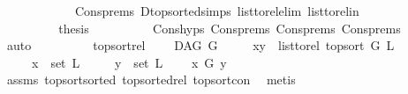 \begin{isabellebody}
\ \ \ \ \ \ \ \ \ \ \ \ Cons{\isachardot}{\kern0pt}prems{\isacharparenleft}{\kern0pt}{}{\isacharparenright}{\kern0pt}\ D{\isachardot}{\kern0pt}top{\isacharunderscore}{\kern0pt}sorted{\isachardot}{\kern0pt}simps{\isacharparenleft}{\kern0pt}{}{\isacharparenright}{\kern0pt}\ list{\isacharunderscore}{\kern0pt}to{\isacharunderscore}{\kern0pt}rel{\isacharunderscore}{\kern0pt}elim\ list{\isacharunderscore}{\kern0pt}to{\isacharunderscore}{\kern0pt}rel{\isacharunderscore}{\kern0pt}in{\isacharparenright}{\kern0pt}\ \isanewline
\ \ \ \ \isamarkupfalse%
\isanewline
\ \ \ \ \ \ \isamarkupfalse%
\ {}\isanewline
\ \ \ \ \ \ \isamarkupfalse%
\ \isamarkupfalse%
\ {\isacharquery}{\kern0pt}thesis\isanewline
\ \ \ \ \ \ \ \ \isamarkupfalse%
\ Cons{\isachardot}{\kern0pt}hyps\ Cons{\isachardot}{\kern0pt}prems{\isacharparenleft}{\kern0pt}{}{\isacharparenright}{\kern0pt}\ Cons{\isachardot}{\kern0pt}prems{\isacharparenleft}{\kern0pt}{}{\isacharparenright}{\kern0pt}\ Cons{\isachardot}{\kern0pt}prems{\isacharparenleft}{\kern0pt}{}{\isacharparenright}{\kern0pt}\ \isamarkupfalse%
\ auto\ \isanewline
\ \ \ \ \isamarkupfalse%
\isanewline
\ \ \isamarkupfalse%
\isanewline
{}\isamarkupfalse%
%
\endisatagproof
{\isafoldproof}%
%
\isadelimproof
\isanewline
%
\endisadelimproof
\isanewline
\isanewline
{}\isamarkupfalse%
\ top{\isacharunderscore}{\kern0pt}sort{\isacharunderscore}{\kern0pt}rel{}{\isacharcolon}{\kern0pt}\ \isanewline
\ \ \ {\isachardoublequoteopen}DAG\ G{\isachardoublequoteclose}\isanewline
\ \ \ \ \ {\isachardoublequoteopen}{\isacharparenleft}{\kern0pt}x{\isacharcomma}{\kern0pt}y{\isacharparenright}{\kern0pt}\ {\isasymin}\ list{\isacharunderscore}{\kern0pt}to{\isacharunderscore}{\kern0pt}rel\ {\isacharparenleft}{\kern0pt}top{\isacharunderscore}{\kern0pt}sort\ G\ L{\isacharparenright}{\kern0pt}{\isachardoublequoteclose}\isanewline
\ \ \ \ \ {\isachardoublequoteopen}x\ {\isasymin}\ set\ L{\isachardoublequoteclose}\isanewline
\ \ \ \ \ {\isachardoublequoteopen}y\ {\isasymin}\ set\ L{\isachardoublequoteclose}\isanewline
\ \ \ {\isachardoublequoteopen}{\isasymnot}\ x\ {\isasymrightarrow}\isactrlsup {\isacharplus}{\kern0pt}\isactrlbsub G\isactrlesub \ y{\isachardoublequoteclose}\isanewline
%
\isadelimproof
\ \ %
\endisadelimproof
%
\isatagproof
{}\isamarkupfalse%
\ assms\ top{\isacharunderscore}{\kern0pt}sort{\isacharunderscore}{\kern0pt}sorted\ top{\isacharunderscore}{\kern0pt}sorted{\isacharunderscore}{\kern0pt}rel{}\ top{\isacharunderscore}{\kern0pt}sort{\isacharunderscore}{\kern0pt}con\ \isamarkupfalse%
\ metis%
\endisatagproof
{\isafoldproof}%
%
\isadelimproof
\isanewline
%
\endisadelimproof
\ \isanewline
\isanewline
%
\isadelimtheory
\isanewline
%
\endisadelimtheory
%
\isatagtheory
{}\isamarkupfalse%
%
\endisatagtheory
{\isafoldtheory}%
%
\isadelimtheory
%
\endisadelimtheory
%
\end{isabellebody}%
